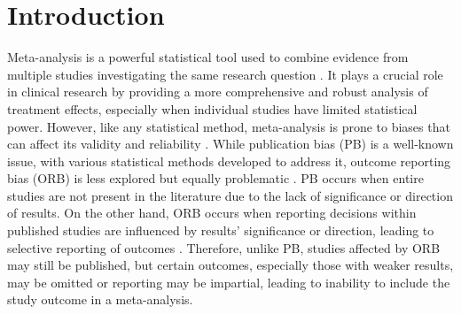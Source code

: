 \documentclass[twocolumn]{article}\usepackage[]{graphicx}\usepackage[]{xcolor}
\begin{document}
\section{Introduction}
Meta-analysis is a powerful statistical tool used to combine evidence from multiple studies investigating the same research question \citep{DerSimonian, handbook}. It plays a crucial role in clinical research by providing a more comprehensive and robust analysis of treatment effects, especially when individual studies have limited statistical power. However, like any statistical method, meta-analysis is prone to biases that can affect its validity and reliability \citep{handbook, Schmid2022, Egger2022}. While publication bias (PB) is a well-known issue, with various statistical methods developed to address it, outcome reporting bias (ORB) is less explored but equally problematic \citep{handbook, Schmid2022, Egger2022, protocolORB}. PB occurs when entire studies are not present in the literature due to the lack of significance or direction of results. On the other hand, ORB occurs when reporting decisions within published studies are influenced by results' significance or direction, leading to selective reporting of outcomes \citep{ORBimpact, Copas2014, Copas2019, Schmid2022, Kirkham2012, Egger2022, dutch, ORBIT_paper, Thomas2022}. Therefore, unlike PB, studies affected by ORB may still be published, but certain outcomes, especially those with weaker results, may be omitted or reporting may be impartial, leading to inability to include the study outcome in a meta-analysis. 
\end{document}

